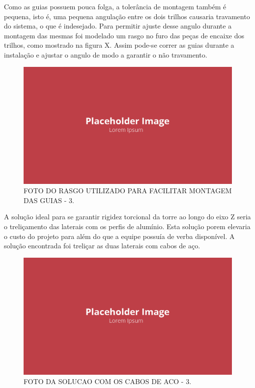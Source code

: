 Como as guias possuem pouca folga, a tolerância de montagem também é pequena, isto é, uma pequena angulação entre os dois trilhos causaria travamento do sistema, o que é indesejado. Para permitir ajuste desse angulo durante a montagem das mesmas foi modelado um rasgo no furo das peças de encaixe dos trilhos, como mostrado na figura X. Assim pode-se correr as guias durante a instalação e ajustar o angulo de modo a garantir o não travamento.

\begin{figure}[!ht]
    \centering
    \includegraphics[width=.8\linewidth]{figuras/placeholder.png}
    \caption{FOTO DO RASGO UTILIZADO PARA FACILITAR MONTAGEM DAS GUIAS - 3\cite{autor}.}
    \label{fig:placeholder}
\end{figure}

A solução ideal para se garantir rigidez torcional da torre ao longo do eixo Z seria o treliçamento das laterais com os perfis de alumínio. Esta solução porem elevaria o custo do projeto para além do que a equipe possuía de verba disponível. A solução encontrada foi treliçar as duas laterais com cabos de aço.

\begin{figure}[!ht]
    \centering
    \includegraphics[width=.8\linewidth]{figuras/placeholder.png}
    \caption{FOTO DA SOLUCAO COM OS CABOS DE ACO - 3\cite{autor}.}
    \label{fig:placeholder}
\end{figure}

